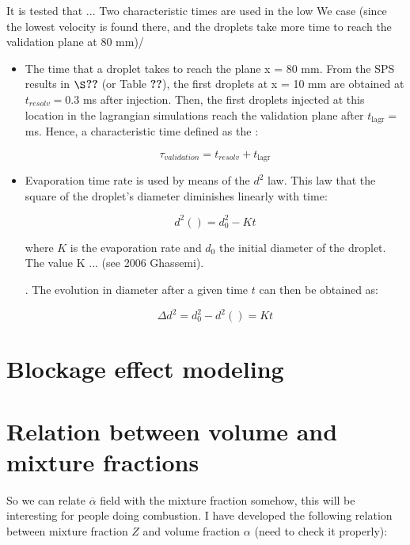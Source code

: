 It is tested that ... Two characteristic times are used in the low We case (since the lowest velocity is found there, and the droplets take more time to reach the validation plane at 80 mm)/

\begin{itemize}

	\item The time that a droplet takes to reach the plane x = 80 mm. From the SPS results in $\S$\textbf{??} (or Table \textbf{??}), the first droplets at x = 10 mm are obtained at $t_{resolv} = 0.3$ ms after injection. Then, the first droplets injected at this location in the lagrangian simulations reach the validation plane after $t_\mathrm{lagr} = $ ms. Hence, a characteristic time defined as the :
	
	\begin{equation}
	\tau_{validation} = t_{resolv}  + t_\mathrm{lagr}
	\end{equation}
	
	\item Evaporation time rate is used by means of the $d^2$ law. This law that the square of the droplet's diameter diminishes linearly with time:
	
	\begin{equation}
	\label{eq:d2_law}
	d^2 \left( \right) = d_0^2 - K t
	\end{equation}
	
	
	where $K$ is the evaporation rate and $d_0$ the initial diameter of the droplet. The value K ... (see 2006 Ghassemi).
	
	
	. The evolution in diameter after a given time $t$ can then be obtained as:
	
	\begin{equation}
	\Delta d^2 = d_0^2 - d^2 \left( \right) = K t
	\end{equation}
	

\end{itemize}

\section{Blockage effect modeling}

\section{Relation between volume and mixture fractions}

So we can relate $\overline{\alpha}$ field with the mixture fraction somehow, this will be interesting for people doing combustion. I have developed the following relation between mixture fraction $Z$ and volume fraction $\alpha$ (need to check it properly):

